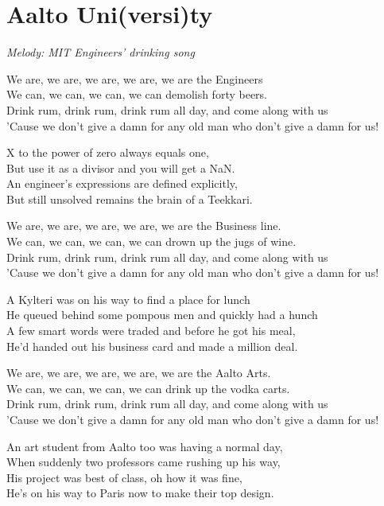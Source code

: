 \section{Aalto Uni(versi)ty}
\textit{Melody: MIT Engineers' drinking song}

We are, we are, we are, we are, we are the Engineers\\
We can, we can, we can, we can demolish forty beers.\\
Drink rum, drink rum, drink rum all day, and come along with us\\
'Cause we don't give a damn for any old man who don't give a damn for us!

X to the power of zero always equals one,\\
But use it as a divisor and you will get a NaN.\\
An engineer's expressions are defined explicitly,\\
But still unsolved remains the brain of a Teekkari.

We are, we are, we are, we are, we are the Business line.\\
We can, we can, we can, we can drown up the jugs of wine.\\
Drink rum, drink rum, drink rum all day, and come along with us\\
'Cause we don't give a damn for any old man who don't give a damn for us!

A Kylteri was on his way to find a place for lunch\\
He queued behind some pompous men and quickly had a hunch\\
A few smart words were traded and before he got his meal,\\
He'd handed out his business card and made a million deal.

We are, we are, we are, we are, we are the Aalto Arts.\\
We can, we can, we can, we can drink up the vodka carts.\\
Drink rum, drink rum, drink rum all day, and come along with us\\
'Cause we don't give a damn for any old man who don't give a damn for us!

An art student from Aalto too was having a normal day,\\
When suddenly two professors came rushing up his way,\\
His project was best of class, oh how it was fine,\\
He's on his way to Paris now to make their top design.

